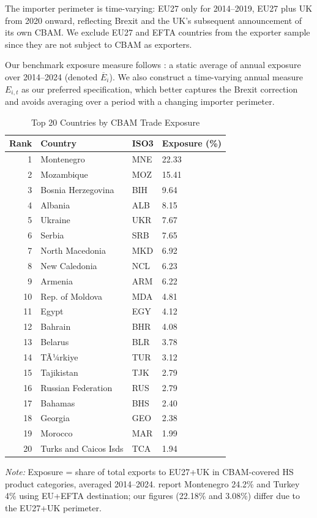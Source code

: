\documentclass[12pt,a4paper]{article}
\begin{document}
The importer perimeter is time-varying: EU27 only for 2014--2019, EU27 plus UK from 2020 onward, reflecting Brexit and the UK's subsequent announcement of its own CBAM. We exclude EU27 and EFTA countries from the exporter sample since they are not subject to CBAM as exporters.

Our benchmark exposure measure follows \citet{Bahi2026}: a static average of annual exposure over 2014--2024 (denoted $\overline{E}_i$). We also construct a time-varying annual measure $E_{i,t}$ as our preferred specification, which better captures the Brexit correction and avoids averaging over a period with a changing importer perimeter.

\begin{table}[htbp]
\centering
\begin{threeparttable}
\caption{Top 20 Countries by CBAM Trade Exposure}\label{tab:exposure}
\begin{tabular}{rlll}
\toprule
Rank & Country & ISO3 & Exposure (\%) \\
\midrule
1 & Montenegro & MNE & 22.33 \\
2 & Mozambique & MOZ & 15.41 \\
3 & Bosnia Herzegovina & BIH & 9.64 \\
4 & Albania & ALB & 8.15 \\
5 & Ukraine & UKR & 7.67 \\
6 & Serbia & SRB & 7.65 \\
7 & North Macedonia & MKD & 6.92 \\
8 & New Caledonia & NCL & 6.23 \\
9 & Armenia & ARM & 6.22 \\
10 & Rep. of Moldova & MDA & 4.81 \\
11 & Egypt & EGY & 4.12 \\
12 & Bahrain & BHR & 4.08 \\
13 & Belarus & BLR & 3.78 \\
14 & TÃ¼rkiye & TUR & 3.12 \\
15 & Tajikistan & TJK & 2.79 \\
16 & Russian Federation & RUS & 2.79 \\
17 & Bahamas & BHS & 2.40 \\
18 & Georgia & GEO & 2.38 \\
19 & Morocco & MAR & 1.99 \\
20 & Turks and Caicos Isds & TCA & 1.94 \\
\bottomrule
\end{tabular}
\begin{tablenotes}\small
\item \textit{Note:} Exposure = share of total exports to EU27+UK in CBAM-covered HS product categories, averaged 2014--2024. \citet{Bahi2026} report Montenegro 24.2\% and Turkey 4\% using EU+EFTA destination; our figures (22.18\% and 3.08\%) differ due to the EU27+UK perimeter.
\end{tablenotes}
\end{threeparttable}
\end{table}
\end{document}
